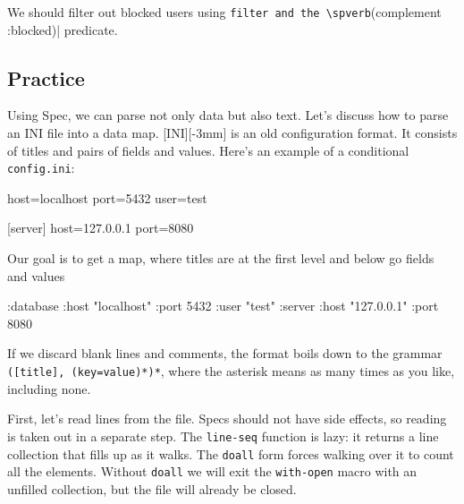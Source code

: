 \fi


We should filter out blocked users using \verb|filter and the \spverb|(complement :blocked)| predicate.

\subsection{Practice}


Using Spec, we can parse not only data but also text. Let's discuss how to parse an INI file into a data map.
[INI][-3mm] is an old configuration format. It consists of titles and pairs of fields and values. Here's an example of a conditional  \verb|config.ini|:

\begin{english}
  \begin{ini}
[database]
host=localhost
port=5432
user=test

[server]
host=127.0.0.1
port=8080
  \end{ini}
\end{english}

Our goal is to get a map, where titles are at the first level and below go fields and values

\begin{english}
  \begin{clojure}
{:database {:host "localhost"
            :port 5432
            :user "test"}
 :server {:host "127.0.0.1"
          :port 8080}}
  \end{clojure}
\end{english}

If we discard blank lines and comments, the format boils down to the grammar \verb|([title], (key=value)*)*|, where the asterisk means as many times as you like, including none.


First, let's read lines from the file. Specs should not have side effects, so reading is taken out in a separate step. The \verb|line-seq| function is lazy: it returns a line collection that fills up as it walks. The \verb|doall| form forces walking over it to count all the elements. Without \verb|doall| we will exit the \verb|with-open| macro with an unfilled collection, but the file will already be closed.

